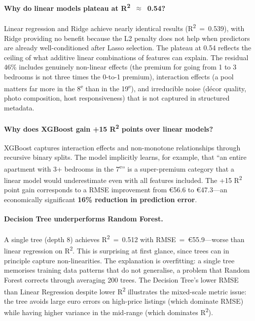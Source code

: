 \documentclass[12pt, a4paper]{article}
\begin{document}
\paragraph{Why do linear models plateau at R\textsuperscript{2}~$\approx$~0.54?}
Linear regression and Ridge achieve nearly identical results (R\textsuperscript{2}~=~0.539), with Ridge providing no benefit because the L2 penalty does not help when predictors are already well-conditioned after Lasso selection. The plateau at 0.54 reflects the ceiling of what additive linear combinations of features can explain. The residual 46\% includes genuinely non-linear effects (the premium for going from 1 to 3 bedrooms is not three times the 0-to-1 premium), interaction effects (a pool matters far more in the 8\textsuperscript{e} than in the 19\textsuperscript{e}), and irreducible noise (décor quality, photo composition, host responsiveness) that is not captured in structured metadata.

\paragraph{Why does XGBoost gain +15 R\textsuperscript{2} points over linear models?}
XGBoost captures interaction effects and non-monotone relationships through recursive binary splits. The model implicitly learns, for example, that ``an entire apartment with 3+ bedrooms in the 7\textsuperscript{e}'' is a super-premium category that a linear model would underestimate even with all features included. The +15 R\textsuperscript{2} point gain corresponds to a RMSE improvement from \euro{}56.6 to \euro{}47.3---an economically significant \textbf{16\% reduction in prediction error}.

\paragraph{Decision Tree underperforms Random Forest.}
A single tree (depth 8) achieves R\textsuperscript{2}~=~0.512 with RMSE~=~\euro{}55.9---worse than linear regression on R\textsuperscript{2}. This is surprising at first glance, since trees can in principle capture non-linearities. The explanation is overfitting: a single tree memorises training data patterns that do not generalise, a problem that Random Forest corrects through averaging 200 trees. The Decision Tree's lower RMSE than Linear Regression despite lower R\textsuperscript{2} illustrates the mixed-scale metric issue: the tree avoids large euro errors on high-price listings (which dominate RMSE) while having higher variance in the mid-range (which dominates R\textsuperscript{2}).
\end{document}
